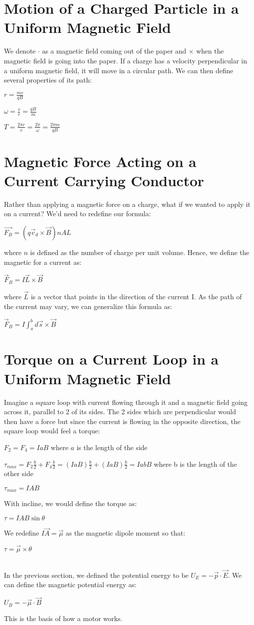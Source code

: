 \documentclass[12pt]{report}
\begin{document}
	\section{Motion of a Charged Particle in a Uniform Magnetic Field}
		We denote $\cdot$ as a magnetic field coming out of the paper and $\times$ when the magnetic field is going into the paper. If a charge has a velocity perpendicular in a uniform magnetic field, it will move in a circular path. We can then define several properties of its path:\\
		\centerline{$ r = \frac{mv}{qB}$}
		\centerline{$ \omega = \frac{v}{r} = \frac{qB}{m}$}
		\centerline{$ T = \frac{2\pi r}{v} = \frac{2\pi}{\omega} = \frac{2\pi m}{qB}$}
	\section{Magnetic Force Acting on a Current Carrying Conductor}
		Rather than applying a magnetic force on a charge, what if we wanted to apply it on a current? We'd need to redefine our formula:\\
		\centerline{$\vec{F_B} = (q\vec{v}_d \times \vec{B})nAL$}
		where $n$ is defined as the number of charge per unit volume. Hence, we define the magnetic for a current as:\\
		\centerline{$\vec{F}_B = I\vec{L} \times \vec{B}$}
		where $\vec{L}$ is a vector that points in the direction of the current I. As the path of the current may vary, we can generalize this formula as:\\
		\centerline{$\vec{F}_B = I\int_{a}^{b} d\vec{s} \times \vec{B}$}
	\section{Torque on a Current Loop in a Uniform Magnetic Field}
		Imagine a square loop with current flowing through it and a magnetic field going across it, parallel to 2 of its sides. The 2 sides which are perpendicular would then have a force but since the current is flowing in the opposite direction, the square loop would feel a torque:\\
		\centerline{$F_2 = F_4 = IaB$ where $a$ is the length of the side}
		\centerline{$\tau_{max} = F_2 \frac{b}{2} + F_4 \frac{b}{2} = (IaB) \frac{b}{2} + (IaB)\frac{b}{2} = IabB$ where b is the length of the other side}
		\centerline{$\tau_{max} = IAB$}
		With incline, we would define the torque as:\\
		\centerline{$\tau = IAB\sin \theta$}
		We redefine $I\vec{A} = \vec{\mu}$ as the magnetic dipole moment so that:\\
		\centerline{$\tau = \vec{\mu} \times \theta$}
		\\
		In the previous section, we defined the potential energy to be $U_E = -\vec{p} \cdot \vec{E}$. We can define the magnetic potential energy as:\\
		\centerline{$U_B = -\vec{\mu} \cdot \vec{B}$}
		This is the basis of how a motor works.
\end{document}
